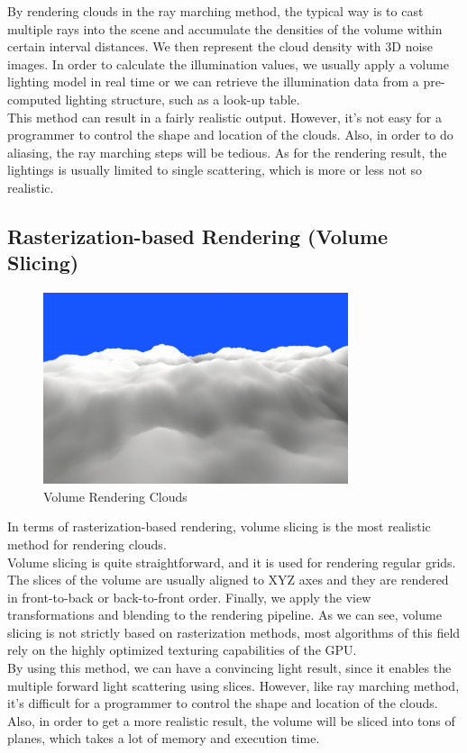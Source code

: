 By rendering clouds in the ray marching method, the typical way is to cast multiple rays into the scene and accumulate the densities of the volume within certain interval distances. We then represent the cloud density with 3D noise images. In order to calculate the illumination values, we usually apply a volume lighting model in real time or we can retrieve the illumination data from a pre-computed lighting structure, such as a look-up table.\\
This method can result in a fairly realistic output. However, it's not easy for a programmer to control the shape and location of the clouds. Also, in order to do aliasing, the ray marching steps will be tedious. As for the rendering result, the lightings is usually limited to single scattering, which is more or less not so realistic.

\subsection{Rasterization-based Rendering (Volume Slicing)}

\begin{figure}[htp]
\begin{center}
\includegraphics[scale=1.0]{images/volumerendering.png}
\caption{Volume Rendering Clouds}
\label{f4}
\end{center}
\end{figure}

In terms of rasterization-based rendering, volume slicing is the most realistic method for rendering clouds.\\
Volume slicing is quite straightforward, and it is used for rendering regular grids. The slices of the volume are usually aligned to XYZ axes and they are rendered in front-to-back or back-to-front order. Finally, we apply the view transformations and blending to the rendering pipeline. As we can see, volume slicing is not strictly based on rasterization methods, most algorithms of this field rely on the highly optimized texturing capabilities of the GPU.\\
By using this method, we can have a convincing light result, since it enables the multiple forward light scattering using slices. However, like ray marching method, it's difficult for a programmer to control the shape and location of the clouds. Also, in order to get a more realistic result, the volume will be sliced into tons of planes, which takes a lot of memory and execution time.

